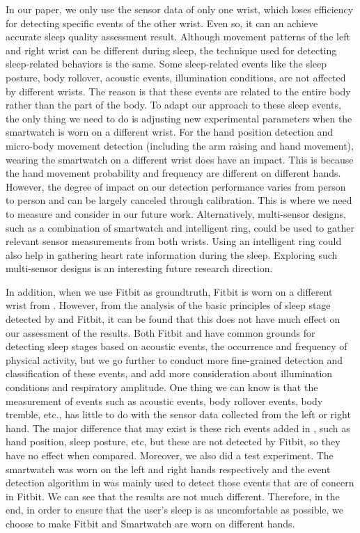  In our paper, we only use the sensor data of only one wrist, which loses efficiency for detecting
specific events of the other wrist. Even so, it can an achieve accurate sleep quality assessment result. Although movement patterns of the
left and right wrist can be different during sleep, the technique used for detecting sleep-related behaviors is the same. Some sleep-related events like the sleep posture, body rollover, acoustic events, illumination conditions, are not affected by different wrists. The
reason is that these events are related to the entire body rather than the part of the body. To adapt our approach to these sleep events,
the only thing we need to do is adjusting new experimental parameters when the smartwatch is worn on a different wrist. For the hand
position detection and micro-body movement detection (including the arm raising and hand movement), wearing the smartwatch on a
different wrist does have an impact. This is because the hand movement probability and frequency are different on different hands. However,
the degree of impact on our detection performance varies from person to person and can be largely canceled through calibration. This is
where we need to measure and consider in our future work. Alternatively, multi-sensor designs, such as a combination of smartwatch and
intelligent ring, could be used to gather relevant sensor measurements from both wrists. Using an intelligent ring could also help in
gathering heart rate information during the sleep. Exploring such multi-sensor designs is an interesting future research direction.

 In addition, when we use Fitbit as groundtruth, Fitbit is worn on a different wrist from {\systemname}.
However, from the analysis of the basic principles of sleep stage detected by {\systemname} and Fitbit, it can be found that this does not
have much effect on our assessment of the results. Both Fitbit and {\systemname} have common grounds for detecting sleep stages based on
acoustic events, the occurrence and frequency of physical activity, but we go further to conduct more fine-grained detection and
classification of these events, and add more consideration about illumination conditions and respiratory amplitude. One thing we can know
is that the measurement of events such as acoustic events, body rollover events, body tremble, etc., has little to do with the sensor data
collected from the left or right hand. The major difference that may exist is these rich events added in {\systemname}, such as hand
position, sleep posture, etc, but these are not detected by Fitbit, so they have no effect when compared. Moreover, we also did a test
experiment. The smartwatch was worn on the left and right hands respectively and the event detection algorithm in {\systemname} was mainly
used to detect those events that are of concern in Fitbit. We can see that the results are not much different. Therefore, in the end, in
order to ensure that the user's sleep is as uncomfortable as possible, we choose to make Fitbit and Smartwatch are worn on different hands.


